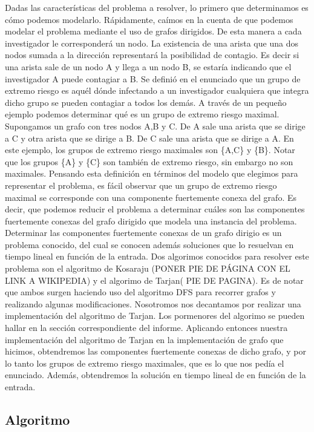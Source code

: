 \quad Dadas las características del problema a resolver, lo primero que determinamos es cómo podemos modelarlo. Rápidamente, caímos en la cuenta de que podemos modelar el problema mediante el uso de grafos dirigidos. De esta manera a cada investigador le corresponderá un nodo. La existencia de una arista que una dos nodos sumada a la dirección representará la posibilidad de contagio. Es decir si una arista sale de un nodo A y llega a un nodo B, se estaría indicando que el investigador A puede contagiar a B.
\quad Se definió en el enunciado que un grupo de extremo riesgo es aquél dónde infectando a un investigador cualquiera que integra dicho grupo se pueden contagiar a todos los demás. A través de un pequeño ejemplo podemos determinar qué es un grupo de extremo riesgo maximal.
\quad Supongamos un grafo con tres nodos A,B y C. De A sale una arista que se dirige a C y otra arista que se dirige a B. De C sale una arista que se dirige a A. En este ejemplo, los grupos de extremo riesgo maximales son \{A,C\} y \{B\}. Notar que los grupos \{A\} y \{C\} son también de extremo riesgo, sin embargo no son maximales.
\quad Pensando esta definición en términos del modelo que elegimos para representar el problema, es fácil observar que un grupo de extremo riesgo maximal se corresponde con una componente fuertemente conexa del grafo. Es decir, que podemos reducir el problema a determinar cuáles son las componentes fuertemente conexas del grafo dirigido que modela una instancia del problema. 
\quad Determinar las componentes fuertemente conexas de un grafo dirigio es un problema conocido, del cual se conocen además soluciones que lo resuelvan en tiempo lineal en función de la entrada.
\quad Dos algorimos conocidos para resolver este problema son el algoritmo de Kosaraju (PONER PIE DE PÁGINA CON EL LINK A WIKIPEDIA) y el algorimo de Tarjan( PIE DE PAGINA). Es de notar que ambos surgen haciendo uso del algoritmo DFS para recorrer grafos y realizando algunas modificaciones.  Nosotromos nos decantamos por realizar una implementación del algoritmo de Tarjan. Los pormenores del algorimo se pueden hallar en la sección correspondiente del informe.
\quad Aplicando entonces nuestra implementación del algoritmo de Tarjan en la implementación de grafo que hicimos, obtendremos las componentes fuertemente conexas de dicho grafo, y por lo tanto los grupos de extremo riesgo maximales, que es lo que nos pedía el enunciado. Además, obtendremos la solución en tiempo lineal de en función de la entrada.


\subsection{Algoritmo} 

